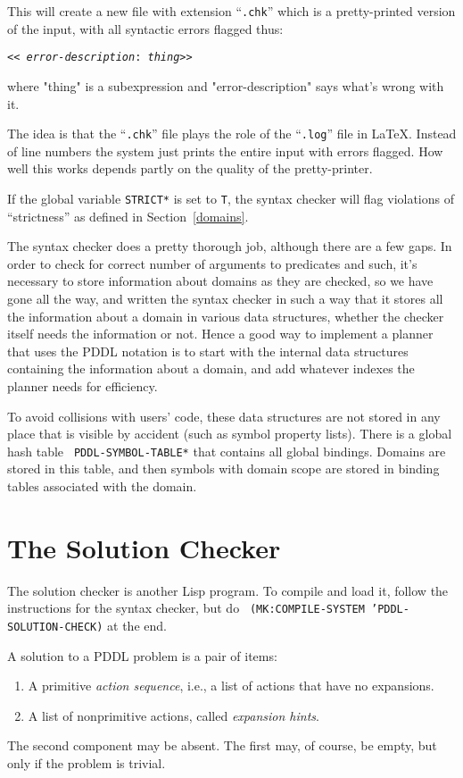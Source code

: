 This will create a new file with extension ``{\tt .chk}'' which is a
pretty-printed version of the input, with all syntactic errors flagged
thus:
\begin{center}
 \tt      << {\em error-description}: {\em thing}>>
\end{center}
where "thing" is a subexpression and "error-description" says what's
wrong with it.

The idea is that the ``{\tt .chk}'' file plays the role of the ``{\tt .log}'' file in
LaTeX.  Instead of line numbers the system just prints the entire
input with errors flagged.  How well this works depends partly on the
quality of the pretty-printer.

If the global variable {\tt STRICT*} is set to {\tt T}, the syntax
checker will flag violations of ``strictness'' as defined in
Section~\ref{domains}. 

The syntax checker does a pretty thorough job, although there are a
few gaps.  In order to check for correct number of arguments to
predicates and such, it's necessary to store information about domains
as they are checked, so we have gone all the way, and written the
syntax checker in such a way that it
stores all the
information about a domain in various data structures, whether the
checker itself needs the information or not.  Hence a good way to
implement a planner that uses the PDDL notation is to start with the
internal data structures containing the information about a domain,
and add whatever indexes the planner needs for efficiency.

To avoid collisions with users' code, these data structures are not
stored in any place that is visible by accident (such as symbol
property lists).  There is a global hash table {\tt
PDDL-SYMBOL-TABLE*} that contains all global bindings.  Domains are
stored in this table, and then symbols with domain scope are stored in
binding tables associated with the domain.  

\section{The Solution Checker}

The solution checker is another Lisp program.  To compile and load it,
follow the instructions for the syntax checker, but do {\tt
(MK:COMPILE-SYSTEM 'PDDL-SOLUTION-CHECK)} at the end.  

A solution to a PDDL problem is a pair of items:
\begin{enumerate}
\item A primitive {\em action sequence}, i.e., a list of actions that have
no expansions.
\item A list of nonprimitive actions, called {\em expansion hints}.
\end{enumerate}
The second component may be absent.  The first may, of course, be
empty, but only if the problem is trivial.

